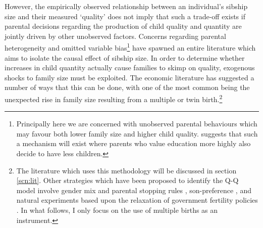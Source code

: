 \documentclass{article}[11pt,subeqn]
\begin{document}
\begin{spacing}{1.25}
However, the empirically observed relationship between an individual's sibship size and their measured `quality' does not imply that such a trade-off exists if parental decisions regarding the production of child quality and quantity are jointly driven by other unobserved factors.  Concerns regarding parental heterogeneity and omitted variable bias\footnote{Principally here we are concerned with unobserved parental behaviours which may favour both lower family size and higher child quality.  \citet{Qian2009} suggests that such a mechanism will exist where parents who value education more highly also decide to have less children.} have spawned an entire literature which aims to isolate the causal effect of sibship size.  In order to determine whether increases in child quantity actually cause families to skimp on quality, exogenous shocks to family size must be exploited.  The economic literature has suggested a number of ways that this can be done, with one of the most common being the unexpected rise in family size resulting from a multiple or twin birth.\footnote{The literature which uses this methodology will be discussed in section \ref{scn:lit}.  Other strategies which have been proposed to identify the Q-Q model involve gender mix and parental stopping rules \citep{ConleyGlauber2006}, son-preference \citep{Lee2008}, and natural experiments based upon the relaxation of government fertility policies \citep{Qian2009}.   In what follows, I only focus on the use of multiple births as an instrument.}


\end{spacing}
\end{document}
